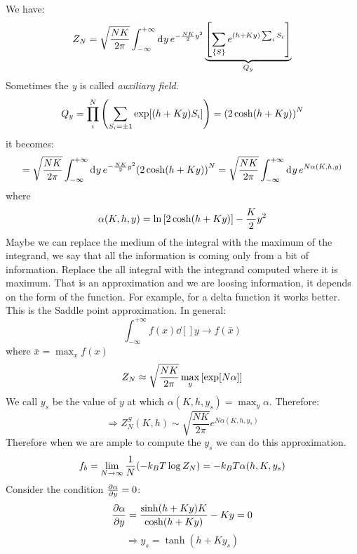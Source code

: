 \documentclass[../main/main.tex]{subfiles}
\begin{document}
We have:
\begin{equation}
  Z_N = \sqrt{\frac{N K}{2 \pi }} \int_{-\infty }^{+ \infty } \dd[]{y} e^{- \frac{NK}{2}y^2} \underbrace{\qty[\sum_{\{ S \}  }^{}  e^{(h+Ky) \sum_{i}^{} S_i  }  ]}_{Q_y}
\end{equation}
Sometimes the \emph{y} is called \emph{auxiliary field}.
\begin{equation}
  Q_y = \prod_{i}^{N} \qty(\sum_{S_i = \pm 1}^{} \exp [ (h+Ky) S_i]  )  = \qty( 2 \cosh (h+Ky))^N
\end{equation}
it becomes:
\begin{equation}
  = \sqrt{\frac{N K}{2 \pi }} \int_{- \infty }^{+ \infty } \dd[]{y} e^{- \frac{NK}{2}y^2} \qty(2 \cosh(h+Ky))^N = \sqrt{\frac{N K}{2 \pi }} \int_{-\infty }^{+\infty } \dd[]{y} e^{N \alpha (K,h,y)}
\end{equation}
where
\begin{equation}
  \alpha (K,h,y) = \ln{\qty[2 \cosh(h+Ky)] } - \frac{K}{2}y^2
\end{equation}
Maybe we can replace the medium of the integral with the maximum of the integrand, we say that all the information is coming only from a bit of information. Replace the all integral with the integrand computed where it is maximum. That is an approximation and we are loosing information, it depends on the form of the function. For example, for a delta function it works better. This is the Saddle point approximation. In general:
\begin{equation}
  \int_{-\infty }^{+ \infty } f(x) \dd[]{y} \rightarrow f(\bar{x} )
\end{equation}
where \( \bar{x} = \max_{x} f(x)  \)
\begin{equation}
  Z_N \approx \sqrt{\frac{N K}{2 \pi }} \max_y \qty[\exp [N \alpha ] ]
\end{equation}
We call \( y_s \) be the value of \( y \) at which \( \alpha (K,h,y_s) = \max_y \alpha  \).
Therefore:
\begin{equation}
  \Rightarrow Z_N^S (K,h) \sim \sqrt{\frac{N K}{2 \pi }} e^{N \alpha (K,h,y_s)}
\end{equation}
Therefore when we are ample to compute the \( y_s \) we can do this approximation.
\begin{equation}
  f_b = \lim_{N \rightarrow \infty } \frac{1}{N} \qty(- k_B T \log{Z_N}) = -k_B T \alpha (h,K,y_s)
\end{equation}
Consider the condition \( \pdv{\alpha }{y} = 0  \):
\begin{equation}
  \pdv{\alpha }{y} = \frac{\sinh (h+Ky)K}{\cosh (h+Ky)} - Ky = 0
\end{equation}
\begin{equation}
  \Rightarrow y_s = \tanh (h+Ky_s)
\end{equation}
\end{document}
